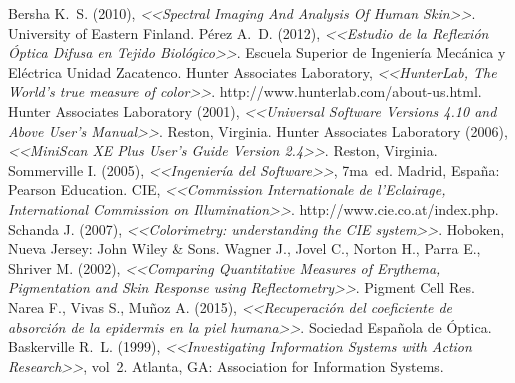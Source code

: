 \makeatletter
\renewcommand\@biblabel[1]{}
\makeatother

\renewcommand\bibname{Referencias}

\begin{thebibliography}{50}

\sangriareferencias
Bersha K.~S. (2010), \emph{<<Spectral Imaging And Analysis Of Human Skin>>}. University of Eastern Finland.
\espacioreferencias
{}\sangriareferencias
P\'{e}rez A.~D. (2012), \emph{<<Estudio de la Reflexi\'{o}n \'{O}ptica Difusa en Tejido Biol\'{o}gico>>}. Escuela Superior de Ingenier\'{i}a Mec\'{a}nica y El\'{e}ctrica Unidad Zacatenco.
\espacioreferencias
{}\sangriareferencias
Hunter Associates Laboratory, \emph{<<HunterLab, The World's true measure of color>>}. http://www.hunterlab.com/about-us.html.
\espacioreferencias
{}\sangriareferencias
Hunter Associates Laboratory (2001), \emph{<<Universal Software Versions 4.10 and Above User's Manual>>}. Reston, Virginia.
\espacioreferencias
{}\sangriareferencias
Hunter Associates Laboratory (2006), \emph{<<MiniScan XE Plus User's Guide Version 2.4>>}. Reston, Virginia.
\espacioreferencias
{}\sangriareferencias
Sommerville I. (2005), \emph{<<Ingenier\'{i}a del Software>>}, 7ma~ed. Madrid, Espa\~{n}a: Pearson Education.
\espacioreferencias
{}\sangriareferencias
CIE, \emph{<<Commission Internationale de l'Eclairage, International Commission on Illumination>>}. http://www.cie.co.at/index.php.
\espacioreferencias
{}\sangriareferencias
Schanda J. (2007), \emph{<<Colorimetry: understanding the CIE system>>}. Hoboken, Nueva Jersey: John Wiley \& Sons.
\espacioreferencias
{}\sangriareferencias
Wagner J., Jovel C., Norton H., Parra E., Shriver M. (2002), \emph{<<Comparing Quantitative Measures of Erythema, Pigmentation and Skin Response using Reflectometry>>}. Pigment Cell Res.
\espacioreferencias
{}\sangriareferencias
Narea F., Vivas S., Mu\~{n}oz A. (2015), \emph{<<Recuperaci\'{o}n del coeficiente de absorci\'{o}n de la epidermis en la piel humana>>}. Sociedad Espa\~{n}ola de \'{O}ptica.
\espacioreferencias
{}\sangriareferencias
Baskerville R.~L. (1999), \emph{<<Investigating Information Systems with Action Research>>}, vol~2. Atlanta, GA: Association for Information Systems.
\espacioreferencias
{}\sangriareferencias

\end{thebibliography}
